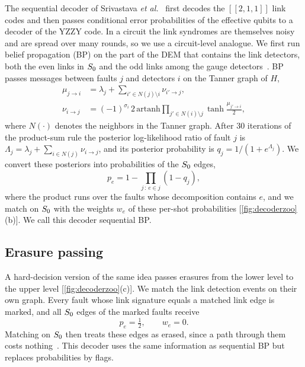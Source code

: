 The sequential decoder of Srivastava \emph{et al.}~\cite{Sri2025} first decodes the $[[2,1,1]]$ link codes and then passes conditional error probabilities of the effective qubits to a decoder of the YZZY code. In a circuit the link syndromes are themselves noisy and are spread over many rounds, so we use a circuit-level analogue. We first run belief propagation (BP) on the part of the DEM that contains the link detectors, both the even links in $S_0$ and the odd links among the gauge detectors~\cite{roffe2020}. BP passes messages between faults $j$ and detectors $i$ on the Tanner graph of $H$,
\begin{align}
  \mu_{j\to i}&=\lambda_j+\sum_{i'\in N(j)\setminus i}\nu_{i'\to j},\label{eq:bp_v}\\
  \nu_{i\to j}&=(-1)^{\sigma_i}\,2\,\mathrm{artanh}\!\prod_{j'\in N(i)\setminus j}\tanh\frac{\mu_{j'\to i}}{2},\label{eq:bp_c}
\end{align}
where $N(\cdot)$ denotes the neighbors in the Tanner graph. After 30 iterations of the product-sum rule the posterior log-likelihood ratio of fault $j$ is $\Lambda_j=\lambda_j+\sum_{i\in N(j)}\nu_{i\to j}$, and its posterior probability is $q_j=1/(1+e^{\Lambda_j})$. We convert these posteriors into probabilities of the $S_0$ edges,
\begin{equation}
  p_e=1-\prod_{j\,:\,e\in j}\left(1-q_j\right),
  \label{eq:posterior_edges}
\end{equation}
where the product runs over the faults whose decomposition contains $e$, and we match on $S_0$ with the weights $w_e$ of these per-shot probabilities [\autoref{fig:decoderzoo}(b)]. We call this decoder sequential BP.

\subsection{Erasure passing}

A hard-decision version of the same idea passes erasures from the lower level to the upper level [\autoref{fig:decoderzoo}(c)]. We match the link detection events on their own graph. Every fault whose link signature equals a matched link edge is marked, and all $S_0$ edges of the marked faults receive
\begin{equation}
  p_e=\tfrac12,\qquad w_e=0 .
  \label{eq:erasure}
\end{equation}
Matching on $S_0$ then treats these edges as erased, since a path through them costs nothing~\cite{stace2009}. This decoder uses the same information as sequential BP but replaces probabilities by flags.

